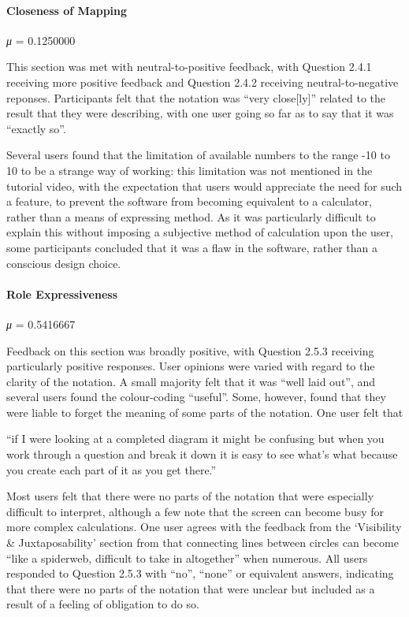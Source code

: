 \documentclass[12pt,twoside,notitlepage,xetex]{report}
\begin{document}
{\paragraph{Closeness of Mapping}\hfill

\emph{μ} = 0.1250000

This section was met with neutral-to-positive feedback, with Question 2.4.1 receiving more positive feedback and Question 2.4.2 receiving neutral-to-negative reponses.  Participants felt that the notation was ``very close[ly]'' related to the result that they were describing, with one user going so far as to say that it was ``exactly so''.

Several users found that the limitation of available numbers to the range -10 to 10 to be a strange way of working: this limitation was not mentioned in the tutorial video, with the expectation that users would appreciate the need for such a feature, to prevent the software from becoming equivalent to a calculator, rather than a means of expressing method.  As it was particularly difficult to explain this without imposing a subjective method of calculation upon the user, some participants concluded that it was a flaw in the software, rather than a conscious design choice.

\paragraph{Role Expressiveness}\hfill

\emph{μ} = 0.5416667

Feedback on this section was broadly positive, with Question 2.5.3 receiving particularly positive responses.  User opinions were varied with regard to the clarity of the notation.  A small majority felt that it was ``well laid out'', and several users found the colour-coding ``useful''.  Some, however, found that they were liable to forget the meaning of some parts of the notation.  One user felt that
\begin{center}
\parbox[c]{\textwidth-2cm}{
\small
``if I were looking at a completed diagram it might be confusing but when you work through a question and break it down it is easy to see what's what because you create each part of it as you get there.''
}
\end{center}

Most users felt that there were no parts of the notation that were especially difficult to interpret, although a few note that the screen can become busy for more complex calculations.  One user agrees with the feedback from the `Visibility \& Juxtaposability' section from that connecting lines between circles can become ``like a spiderweb, difficult to take in altogether'' when numerous.  All users responded to Question 2.5.3 with ``no'', ``none'' or equivalent answers, indicating that there were no parts of the notation that were unclear but included as a result of a feeling of obligation to do so.

}
\end{document}
